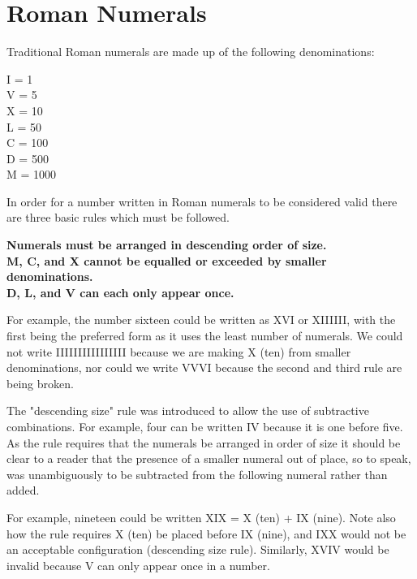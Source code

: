 \section[Appendix: Roman Numerals]{Roman Numerals}
\label{sec:about=roman_numerals}

Traditional Roman numerals are made up of the following denominations:

\begin{center}
I = 1\\
V = 5\\
X = 10\\
L = 50\\
C = 100\\
D = 500\\
M = 1000
\end{center}

In order for a number written in Roman numerals to be considered valid
there are three basic rules which must be followed.

\begin{center}
\textbf{Numerals must be arranged in descending order of size.}\\
\textbf{{M}, {C}, and {X} cannot be equalled or exceeded by smaller
denominations.}\\
\textbf{{D}, {L}, and {V} can each only appear once.}
\end{center}

For example, the number sixteen could be written as {XVI} or {XIIIIII},
with the first being the preferred form as it uses the least number of
numerals. We could not write {IIIIIIIIIIIIIIII} because we are making
{X} (ten) from smaller denominations, nor could we write {VVVI} because
the second and third rule are being broken.

The "descending size" rule was introduced to allow the use of
subtractive combinations. For example, four can be written {IV} because
it is one before five. As the rule requires that the numerals be
arranged in order of size it should be clear to a reader that the
presence of a smaller numeral out of place, so to speak, was
unambiguously to be subtracted from the following numeral rather than
added.

For example, nineteen could be written {XIX} = {X} (ten) + {IX} (nine).
Note also how the rule requires {X} (ten) be placed before {IX} (nine),
and {IXX} would not be an acceptable configuration (descending size
rule). Similarly, {XVIV} would be invalid because {V} can only appear
once in a number.


